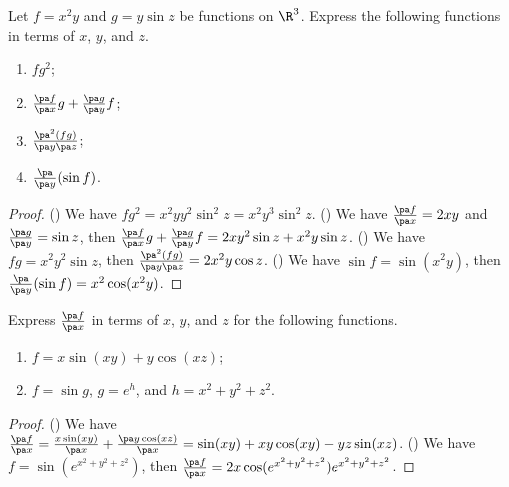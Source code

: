 \newpage
{}
\begin{exercise}[1.1.1]
    Let $f={x}^{2}y$ and $g=y\sin z$ be functions on ${\R}^{3}$. Express the following functions in terms of $x$, $y$, and $z$.
    \begin{enumerate}
        \item $f{g}^{2}$;
        \item $\frac{\pa f}{\pa x}g+\frac{\pa g}{\pa y}f$;
        \item $\frac{{\pa}^{2}(fg)}{\pa y\pa z}$;
        \item $\frac{\pa}{\pa y}(\sin f)$.
    \end{enumerate}
\end{exercise}
\begin{proof}
    () We have $f{g}^{2}={x}^{2}y{y}^{2}{\sin}^{2}z={x}^{2}{y}^{3}{\sin}^{2}z$. () We have $\frac{\pa f}{\pa x}=2xy$ and $\frac{\pa g}{\pa y}=\sin z$, then $\frac{\pa f}{\pa x}g+\frac{\pa g}{\pa y}f=2x{y}^{2}\sin z+{x}^{2}y\sin z$. () We have $fg={x}^{2}{y}^{2}\sin z$, then $\frac{{\pa}^{2}(fg)}{\pa y\pa z}=2{x}^{2}y\cos z$. () We have $\sin f=\sin({x}^{2}y)$, then $\frac{\pa}{\pa y}(\sin f)={x}^{2}\cos({x}^{2}y)$.
\end{proof}
\begin{exercise}[1.1.3]
    Express $\frac{\pa f}{\pa x}$ in terms of $x$, $y$, and $z$ for the following functions.
    \begin{enumerate}
        \item $f=x\sin(xy)+y\cos(xz)$;
        \item $f=\sin g$, $g={e}^{h}$, and $h={x}^{2}+{y}^{2}+{z}^{2}$.
    \end{enumerate}
\end{exercise}
\begin{proof}
    () We have $\frac{\pa f}{\pa x}=\frac{x\sin(xy)}{\pa x}+\frac{\pa y\cos(xz)}{\pa x}=\sin(xy)+xy\cos(xy)-yz\sin(xz)$. () We have $f=\sin({e}^{{x}^{2}+{y}^{2}+{z}^{2}})$, then $\frac{\pa f}{\pa x}=2x\cos({e}^{{x}^{2}+{y}^{2}+{z}^{2}}){e}^{{x}^{2}+{y}^{2}+{z}^{2}}$.
\end{proof}